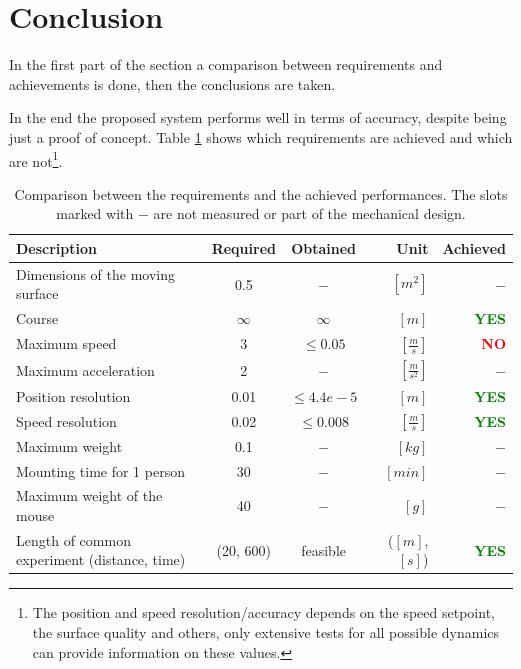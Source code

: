 \documentclass[12pt,a4paper, twoside]{article}
\begin{document}
\newpage
\section{Conclusion} \label{sec:conc}
In the first part of the section a comparison between requirements and achievements is done, then the conclusions are taken.
\newline

In the end the proposed system performs well in terms of accuracy, despite being just a proof of concept. Table \ref{tab:achieved} shows which requirements are achieved and which are not\footnote{The position and speed resolution/accuracy depends on the speed setpoint, the surface quality and others, only extensive tests for all possible dynamics can provide information on these values.}.
\begin{table}[H]
	\centering
	\begin{tabular}{l||c|c|r|r} 
		\textbf{Description}&\textbf{Required} &\textbf{Obtained} &\textbf{Unit} & \textbf{Achieved} \\ 
		\hline
		\hline 
		Dimensions of the moving surface & 0.5 &$-$&$[m^2]$&$-$ \\ 
		\hline 
		Course & $\infty$ &$\infty$ & $[m]$&\textcolor{green}{\textbf{YES}}  \\ 
		\hline 
		Maximum speed & 3 & $\leq0.05$ &$[\frac{m}{s}]$&\textcolor{red}{\textbf{NO}} \\ 
		\hline 
		Maximum acceleration & 2 &$-$ &$[\frac{m}{s^2}]$&$-$  \\ 
		\hline 
		Position resolution & 0.01 & $\leq 4.4e-5$ & $[m]$ &\textcolor{green}{\textbf{YES}}  \\ 
		\hline 
		Speed resolution & 0.02 & $\leq 0.008$ & $[\frac{m}{s}]$ &\textcolor{green}{\textbf{YES}} \\ 
		\hline 
		Maximum weight & 0.1 & $-$ & $[kg]$ & $-$  \\  
		\hline 
		Mounting time for 1 person & 30 & $-$ & $[min]$ & $-$ \\
		\hline 
		Maximum weight of the mouse & 40 & $-$  & $[g]$ & $-$\\
		\hline 
		Length of common experiment (distance, time) & (20, 600) & feasible & ($[m]$,$[s]$) &\textcolor{green}{\textbf{YES}} \\
	\end{tabular} 
	\caption[Achieved performances]{Comparison between the requirements and the achieved performances. The slots marked with $-$ are not measured or part of the mechanical design.}
	\label{tab:achieved}
\end{table}
\end{document}
